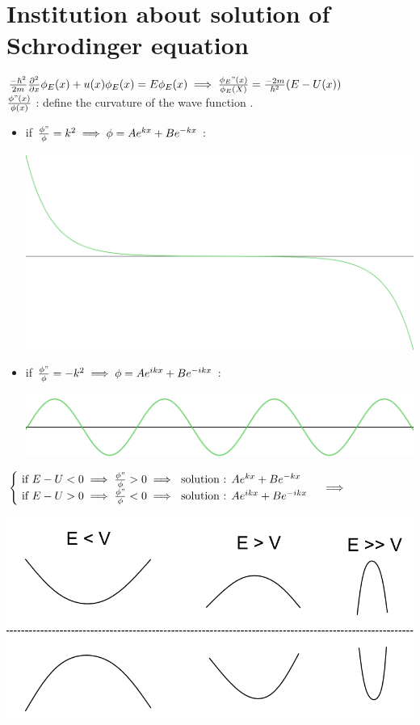 \documentclass[12pt,oneside]{book}
\begin{document}
\section{Institution about solution of Schrodinger equation }
$\frac{-\hbar^2}{2m}\frac{\partial^2}{\partial x}\phi_E(x) + u(x)\phi_E(x) = E\phi_E(x) \implies \frac{\phi_E"(x)}{\phi_E(X)} = \frac{-2m}{\hbar^2}(E-U(x))$ \\
$\frac{\phi"(x)}{\phi(x)}$ : define the curvature of the wave function .
\begin{itemize}
	\item if $\frac{\phi"}{\phi} = k^2 \implies \phi = Ae^{kx} +Be^{-kx}$ :
		\begin{center}
			\includegraphics[width=0.5\linewidth]{../pic/3302/19.png}
		\end{center}
	\item if $\frac{\phi"}{\phi} = -k^2 \implies \phi = Ae^{ikx} +Be^{-ikx}$ :
		\begin{center}
			\includegraphics[width=0.5\linewidth]{../pic/3302/20.png}
		\end{center}
\end{itemize}
 $\begin{cases}
	\text{ if }E-U < 0 \implies \frac{\phi"}{\phi}>0 \implies \text{ solution : } Ae^{kx} + Be^{-kx}\\
	\text{ if }E-U > 0 \implies \frac{\phi"}{\phi}<0 \implies \text{ solution : } Ae^{ikx}+Be^{-ikx}
\end{cases} \implies $
\begin{center}
	\includegraphics[width=0.5\linewidth]{../pic/3302/18.png}
\end{center}
\end{document}
